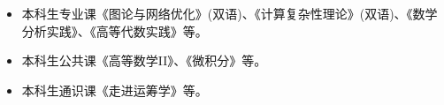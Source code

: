 %
%


\begin{itemize}
	\item 本科生专业课《图论与网络优化》(双语)、《计算复杂性理论》(双语)、《数学分析实践》、《高等代数实践》等。
	\item 本科生公共课《高等数学II》、《微积分》等。
	\item 本科生通识课《走进运筹学》等。
\end{itemize}